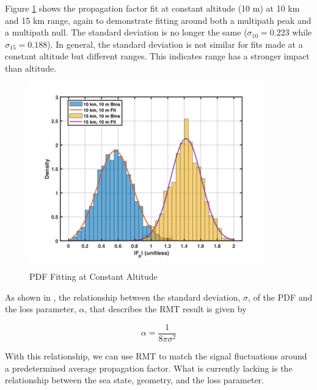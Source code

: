 Figure \ref{stat_fig:5} shows the propagation factor fit at constant altitude (10 m) at 10 km and 15 km range, again to demonstrate fitting around both a multipath peak and a multipath null. The standard deviation is no longer the same ($\sigma_{10} = 0.223$ while $\sigma_{15} = 0.188$). In general, the standard deviation is not similar for fits made at a constant altitude but different ranges. This indicates range has a stronger impact than altitude.

\begin{figure}[H]
  \begin{center}
\includegraphics[width=4in]{../media/statistics/constant_altitude_fit.png}
  \end{center}
  \renewcommand{\baselinestretch}{1} \small\normalsize
  \begin{quote}
    \caption[PDF Fitting at Constant Altitude]{PDF Fitting at Constant Altitude\label{stat_fig:5}}
  \end{quote}
\end{figure}
\renewcommand{\baselinestretch}{2} \small\normalsize

As shown in \cite{yeh_fading}, the relationship between the standard deviation, $\sigma$, of the PDF and the loss parameter, $\alpha$, that describes the RMT result is given by

\begin{equation}
\alpha = \frac{1}{8\pi\sigma^2}
\end{equation}
\renewcommand{\baselinestretch}{2} \small\normalsize

With this relationship, we can use RMT to match the signal fluctuations around a predetermined average propagation factor. What is currently lacking is the relationship between the sea state, geometry, and the loss parameter.

